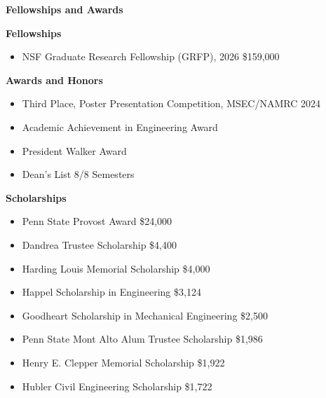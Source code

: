 \begin{center}
    \textbf{Fellowships and Awards}
\end{center}

\textbf{Fellowships}
\begin{itemize}[noitemsep, topsep=0pt, partopsep=0pt, parsep=0pt]
    \item NSF Graduate Research Fellowship (GRFP), 2026 \hfill \$159,000
\end{itemize}

\vspace{6pt}

\textbf{Awards and Honors}
\begin{itemize}[noitemsep, topsep=0pt, partopsep=0pt, parsep=0pt]
    \item Third Place, Poster Presentation Competition, MSEC/NAMRC 2024
    \item Academic Achievement in Engineering Award
    \item President Walker Award
    \item Dean's List 8/8 Semesters
\end{itemize}

\vspace{6pt}

\textbf{Scholarships}
\begin{itemize}[noitemsep, topsep=0pt, partopsep=0pt, parsep=0pt]
    \item Penn State Provost Award \hfill \$24,000
    \item Dandrea Trustee Scholarship \hfill \$4,400
    \item Harding Louis Memorial Scholarship \hfill \$4,000
    \item Happel Scholarship in Engineering \hfill \$3,124
    \item Goodheart Scholarship in Mechanical Engineering \hfill \$2,500
    \item Penn State Mont Alto Alum Trustee Scholarship \hfill \$1,986
    \item Henry E. Clepper Memorial Scholarship \hfill \$1,922
    \item Hubler Civil Engineering Scholarship \hfill \$1,722
\end{itemize}
